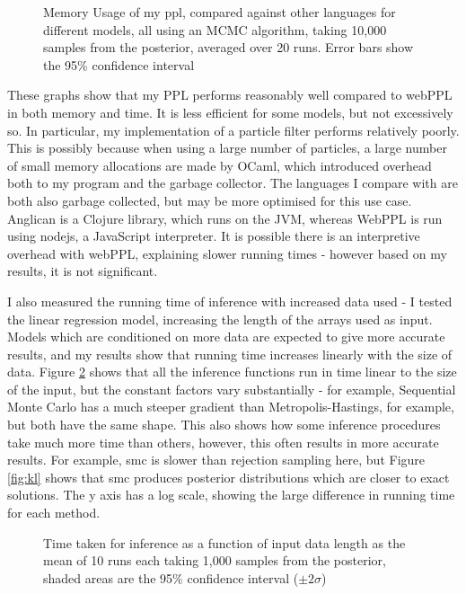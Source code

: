 \begin{figure}[!ht]
	\centering
																										
	\caption{Memory Usage of my ppl, compared against other languages for different models, all using an MCMC algorithm, taking 10,000 samples from the posterior, averaged over 20 runs. Error bars show the 95\% confidence interval}
	\label{fig:mem-perf}
\end{figure}

These graphs show that my PPL performs reasonably well compared to webPPL in both memory and time. It is less efficient for some models, but not excessively so. In particular, my implementation of a particle filter performs relatively poorly. This is possibly because when using a large number of particles, a large number of small memory allocations are made by OCaml, which introduced overhead both to my program and the garbage collector. The languages I compare with are both also garbage collected, but may be more optimised for this use case. Anglican is a Clojure library, which runs on the JVM, whereas WebPPL is run using nodejs, a JavaScript interpreter. It is possible there is an interpretive overhead with webPPL, explaining slower running times - however based on my results, it is not significant.

I also measured the running time of inference with increased data used - I tested the linear regression model, increasing the length of the arrays used as input. Models which are conditioned on more data are expected to give more accurate results, and my results show that running time increases linearly with the size of data. Figure \ref{fig:time-datasize} shows that all the inference functions run in time linear to the size of the input, but the constant factors vary substantially - for example, Sequential Monte Carlo has a much steeper gradient than Metropolis-Hastings, for example, but both have the same shape. This also shows how some inference procedures take much more time than others, however, this often results in more accurate results. For example, smc is slower than rejection sampling here, but Figure \ref{fig:kl} shows that smc produces posterior distributions which are closer to exact solutions. The y axis has a log scale, showing the large difference in running time for each method.

\begin{figure}[!ht]
	\centering
	
	\caption{Time taken for inference as a function of input data length as the mean of 10 runs each taking 1,000 samples from the posterior, shaded areas are the 95\% confidence interval ($\pm 2\sigma$)}
	\label{fig:time-datasize}
\end{figure}


